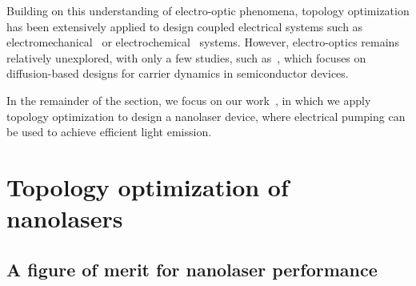 Building on this understanding of electro-optic phenomena, topology optimization has been extensively applied to design coupled electrical systems such as electromechanical~\cite{MEMS_multi,electrostatic_act} or electrochemical~\cite{electrode} systems. However, electro-optics remains relatively unexplored, with only a few studies, such as~\cite{g_heat}, which focuses on diffusion-based designs for carrier dynamics in semiconductor devices.

In the remainder of the section, we focus on our work~\cite{ownpub4}, in which we apply topology 
optimization to design a nanolaser device, where electrical pumping can be used to achieve efficient light emission.

\section{Topology optimization of nanolasers~\cite{ownpub4}}\label{sec:laser}

\subsection*{A figure of merit for nanolaser performance}

